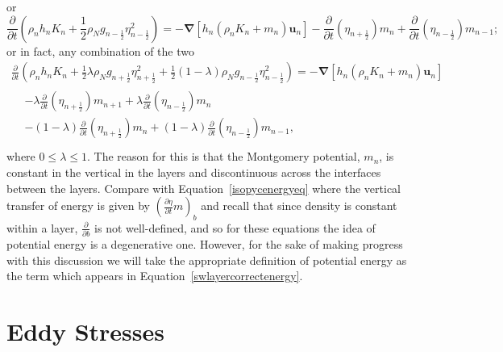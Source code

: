 \documentclass[10pt,a4paper]{report}
\newcommand*\equref[1]{Equation~\eqref{#1}}
\newcommand*{\half}{\frac{1}{2}}
\begin{document}
    or
    \begin{equation}
    \frac{\partial}{\partial t}\left(\rho_{n}h_{n} K_{n}+ 
    \half \rho_{N} g_{n-\half }\eta_{n-\half }^{2} \right) 
    = -\boldsymbol{\nabla} \left[h_{n} \left(\rho_{n}K_{n}+m_{n}\right) \boldsymbol{u}_{n}\right] 
    - \frac{\partial}{\partial t}\left(\eta_{n+\half }\right)   m_{n}
    + \frac{\partial}{\partial t}\left(\eta_{n-\half }\right) m_{n-1};
    \end{equation}
    or in fact, any combination of the two
    \begin{equation}
    \begin{split}
    \frac{\partial}{\partial t}\left(\rho_{n}h_{n} K_{n}+ 
    \half \lambda\rho_{N} g_{n+\half }\eta_{n+\half }^{2}  +
    \half \left(1-\lambda\right)\rho_{N} g_{n-\half }\eta_{n-\half }^{2} \right) 
    = -\boldsymbol{\nabla} \left[h_{n} \left(\rho_{n}K_{n}+m_{n}\right) \boldsymbol{u}_{n}\right] \\
    \begin{split}
    &- \lambda\frac{\partial}{\partial t}\left(\eta_{n+\half }\right)   m_{n+1}
    + \lambda\frac{\partial}{\partial t}\left(\eta_{n-\half }\right) m_{n} \\
    &- \left(1-\lambda\right)\frac{\partial}{\partial t}\left(\eta_{n+\half }\right)   m_{n}
    + \left(1-\lambda\right)\frac{\partial}{\partial t}\left(\eta_{n-\half }\right) m_{n-1}, \\
    \end{split}
    \end{split}
    \end{equation}
    where $0 \leq \lambda \leq 1$. The reason for this is that the Montgomery potential,
    $m_{n}$, is constant in the vertical in the layers and discontinuous across the interfaces between the layers. Compare with \equref{isopycenergyeq} where the 
    vertical transfer of energy is given by 
    $\left(\frac{\partial \eta}{\partial t} m \right)_{b}$ and recall that since density is
     constant within a layer, $\frac{\partial }{\partial b}$ is not well-defined, and so for
      these equations the idea of potential energy is a degenerative one. However,
      for the sake of making progress with this discussion we will take the
      appropriate definition of potential energy as the term which appears in \equref{swlayercorrectenergy}.
    
    
    \section{Eddy Stresses}
    
\end{document}
